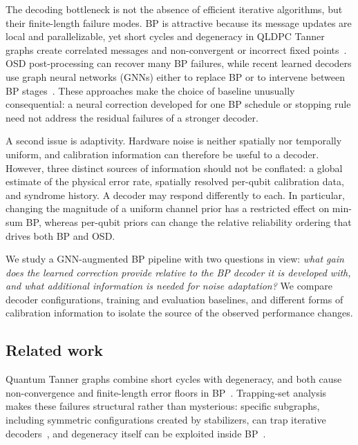 \documentclass[a4paper,twocolumn,11pt,nopdfoutputerror]{quantumarticle}
\begin{document}
The decoding bottleneck is not the absence of efficient iterative
algorithms, but their finite-length failure modes. BP is attractive
because its message updates are local and parallelizable, yet short
cycles and degeneracy in QLDPC Tanner graphs create correlated messages
and non-convergent or incorrect fixed points~\cite{Roffe2020Landscape}.
OSD post-processing can recover many BP failures, while recent learned
decoders use graph neural networks (GNNs) either to replace BP or to
intervene between BP stages~\cite{Gong2024GNN,Maan2025MLBP}. These
approaches make the choice of baseline unusually consequential: a neural
correction developed for one BP schedule or stopping rule need not
address the residual failures of a stronger decoder.

A second issue is adaptivity. Hardware noise is neither spatially nor
temporally uniform, and calibration information can therefore be useful
to a decoder. However, three distinct sources of information should not
be conflated: a global estimate of the physical error rate, spatially
resolved per-qubit calibration data, and syndrome history. A decoder may
respond differently to each. In particular, changing the magnitude of a
uniform channel prior has a restricted effect on min-sum BP, whereas
per-qubit priors can change the relative reliability ordering that drives
both BP and OSD.

We study a GNN-augmented BP pipeline with two questions in view:
\emph{what gain does the learned correction provide relative to the BP
decoder it is developed with, and what additional information is needed
for noise adaptation?} We compare decoder configurations, training and
evaluation baselines, and different forms of calibration information to
isolate the source of the observed performance changes.

\subsection{Related work}\label{sec:related}

Quantum Tanner graphs combine short cycles with degeneracy, and both
cause non-convergence and finite-length error floors in
BP~\cite{MacKay2004Sparse,Poulin2008Iterative,Roffe2020Landscape}.
Trapping-set analysis makes these failures structural rather than
mysterious: specific subgraphs, including symmetric configurations created
by stabilizers, can trap iterative decoders~\cite{Raveendran2021Trapping},
and degeneracy itself can be exploited inside BP~\cite{Kuo2022Degeneracy}.
\end{document}
